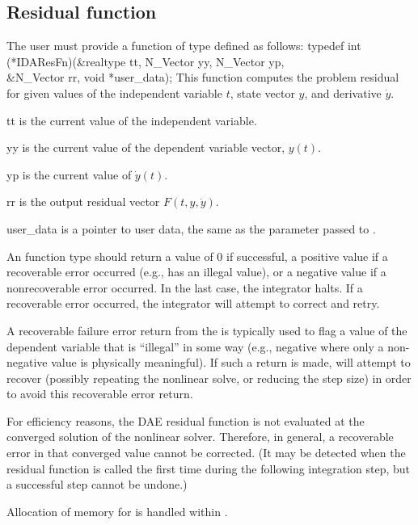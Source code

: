{\subsection{Residual function}\label{ss:resFn}
The user must provide a function of type  defined as follows:
{
  typedef int (*IDAResFn)(&realtype tt, N\_Vector yy, N\_Vector yp,  \\
                          &N\_Vector rr, void *user\_data);
}
{
  This function computes the problem residual for given values
  of the independent variable $t$, state vector $y$, and derivative $\dot{y}$.
}
{
  \begin{args}
  \item[tt]
    is the current value of the independent variable.
  \item[yy]
    is the current value of the dependent variable vector, $y(t)$.
  \item[yp]
    is the current value of $\dot{y}(t)$.
  \item[rr]
    is the output residual vector $F(t,y,\dot{y})$.
  \item[user\_data]
    is a pointer to user data, the same as the 
    parameter passed to .
  \end{args}
}
{
  An  function type should return a value of $0$ if successful,
  a positive value if a recoverable error occurred (e.g.,  has an illegal
  value), or a negative value if a nonrecoverable error occurred.
  In the last case, the integrator halts.
  If a recoverable error occurred, the integrator will attempt to correct and retry.
}
{
  A recoverable failure error return from the  is typically used to
  flag a value of the dependent variable  that is ``illegal'' in
  some way (e.g., negative where only a non-negative value is physically
  meaningful).  If such a return is made, {\ida} will attempt to recover
  (possibly repeating the nonlinear solve, or reducing the step size)
  in order to avoid this recoverable error return.

  For efficiency reasons, the DAE residual function is not evaluated
  at the converged solution of the nonlinear solver. Therefore, in general, a
  recoverable error in that converged value cannot be corrected.  (It may be
  detected when the residual function is called the first time during
  the following integration step, but a successful step cannot be undone.)

  Allocation of memory for  is handled within {\ida}.
}
}
